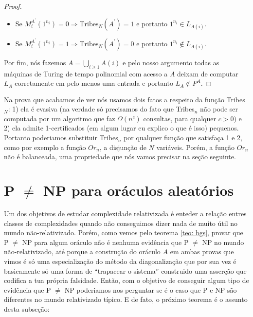 \begin{proof}
\begin{itemize}
    \item Se $M_{i}^{A^{\prime}}(1^{n_{i}}) = 0 \Rightarrow \text{Tribes}_{N}(A^{\prime}) = 1$ e portanto $1^{n_{i}} \in L_{A(i)}$.

    \item Se $M_{i}^{A^{\prime}}(1^{n_{i}}) = 1 \Rightarrow \text{Tribes}_{N}(A^{\prime}) = 0$ e portanto $1^{n_{i}} \notin L_{A(i)}$.

\end{itemize}

    Por fim, nós fazemos $A = \bigcup_{i \geq 1}A(i)$ e pelo nosso argumento todas as máquinas de Turing de tempo polinomial com acesso a $A$ deixam de computar $L_{A}$ corretamente em pelo menos uma entrada e portanto $L_{A} \notin P^{A}$.

\end{proof}

Na prova que acabamos de ver nós usamos dois fatos a respeito da função Tribes$_{N}$: 1) ela é evasiva (na verdade só precisamos do fato que Tribes$_{n}$ não pode ser computada por um algoritmo que faz $\Omega(n^{c})$ consultas, para qualquer $c > 0$) e 2) ela admite 1-certificados (em algum lugar eu explico o que é isso) pequenos. Portanto poderiamos substituir Tribes$_{n}$ por qualquer função que satisfaça 1 e 2, como por exemplo a função $Or_{n}$, a disjunção de $N$ variáveis. Porém, a função $Or_{n}$ não é balanceada, uma propriedade que nós vamos precisar na seção seguinte.

\section{P $\neq$ NP para oráculos aleatórios}

Um dos objetivos de estudar complexidade relativizada é enteder a relação entres classes de complexidades quando não conseguimos dizer nada de muito útil no mundo não-relativizado. Porém, como vemos pelo teorema \ref{teo: bgs}, provar que P $\neq$ NP para algum oráculo não é nenhuma evidência que P $\neq$ NP no mundo não-relativizado, até porque a construção do oráculo $A$ em ambas provas que vimos é só uma especialização do método da diagonalização que por sua vez é basicamente só uma forma de ``trapacear o sistema'' construido uma asserção que codifica a tua própria falsidade. Então, com o objetivo de conseguir algum tipo de evidência que P $\neq$ NP poderiamos nos perguntar se é o caso que P e NP são diferentes no mundo relativizado típico. E de fato, o próximo teorema é o assunto desta subseção:

